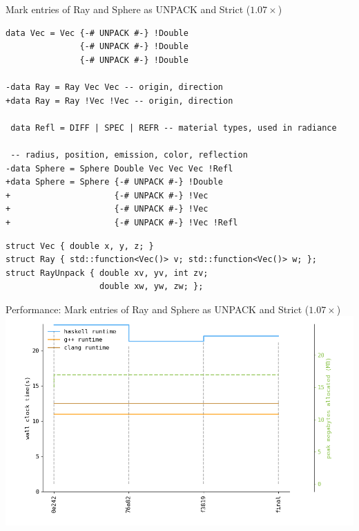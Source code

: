 \documentclass[8pt]{beamer}
\begin{document}
\begin{frame}[fragile]{Mark entries of Ray and Sphere as UNPACK and Strict ($1.07\times$)}

\begin{verbatim}
data Vec = Vec {-# UNPACK #-} !Double 
               {-# UNPACK #-} !Double 
               {-# UNPACK #-} !Double

-data Ray = Ray Vec Vec -- origin, direction
+data Ray = Ray !Vec !Vec -- origin, direction

 data Refl = DIFF | SPEC | REFR -- material types, used in radiance

 -- radius, position, emission, color, reflection
-data Sphere = Sphere Double Vec Vec Vec !Refl
+data Sphere = Sphere {-# UNPACK #-} !Double 
+                     {-# UNPACK #-} !Vec 
+                     {-# UNPACK #-} !Vec 
+                     {-# UNPACK #-} !Vec !Refl
\end{verbatim}

\begin{verbatim}
struct Vec { double x, y, z; }
struct Ray { std::function<Vec()> v; std::function<Vec()> w; };
struct RayUnpack { double xv, yv, int zv;
                   double xw, yw, zw; };
\end{verbatim}

\end{frame}

\begin{frame}[fragile]{Performance: Mark entries of Ray and Sphere as UNPACK and Strict ($1.07\times$)}
\includegraphics[height=0.6\textwidth]{perfdata-upto-f3819-gen.png}
\end{frame}
\end{document}
